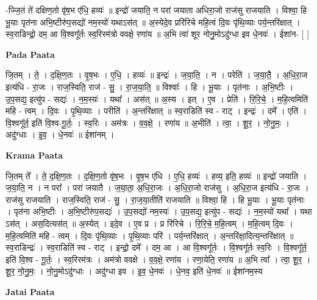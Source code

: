 \documentclass[17pt]{extarticle}
\begin{document}
-ज्जि॒तं ते॑ दक्षिण॒तो वृ॑ष॒भ ए॑धि॒ हव्यः॑ ॥ इन्द्रो॑ जयाति॒ न परा॑ जयाता अधिरा॒जो राज॑सु राजयाति । विश्वा॒ हि भू॒याः पृत॑ना अभि॒ष्टीरु॑प॒सद्यो॑ नम॒स्यो॑ यथाऽस॑त् ॥ अ॒स्येदे॒व प्ररि॑रिचे महि॒त्वं दि॒वः पृ॑थि॒व्याः पर्य॒न्तरि॑क्षात् । स्व॒राडिन्द्रो॒ दम॒ आ वि॒श्वगू᳚र्तः स्व॒रिरम॑त्रो ववक्षे॒ रणा॑य ॥ अ॒भि त्वा॑ शूर नोनु॒मोऽदु॑ग्धा इव धे॒नवः॑ । ईशा॑न- [  ] \newline

\textbf{Pada Paata} \newline

जि॒तम् । ते॒ । द॒क्षि॒ण॒तः । वृ॒ष॒भः । ए॒धि॒ । हव्यः॑ ॥ इन्द्रः॑ । ज॒या॒ति॒ । न । परेति॑ । ज॒या॒तै॒ । अ॒धि॒रा॒ज इत्य॑धि - रा॒जः । राज॒स्विति॒ राज॑ - सु॒ । रा॒ज॒या॒ति॒ ॥ विश्वाः᳚ । हि । भू॒याः । पृत॑नाः । अ॒भि॒ष्टीः । उ॒प॒सद्य॒ इत्यु॑प - सद्यः॑ । न॒म॒स्यः॑ । यथा᳚ । अस॑त् ॥ अ॒स्य । इत् । ए॒व । प्रेति॑ । रि॒रि॒चे॒ । म॒हि॒त्वमिति॑ महि - त्वम् । दि॒वः । पृ॒थि॒व्याः । परीति॑ । अ॒न्तरि॑क्षात् ॥ स्व॒राडिति॑ स्व - राट् । इन्द्रः॑ । दमे᳚ । एति॑ । वि॒श्वगू᳚र्त॒ इति॑ वि॒श्व-गू॒र्तः॒ । स्व॒रिः । अम॑त्रः । व॒व॒क्षे॒ ।    रणा॑य ॥ अ॒भीति॑ । त्वा॒ । शू॒र॒ । नो॒नु॒मः॒ । अदु॑ग्धाः । इ॒व॒ । धे॒नवः॑ ॥ ईशा॑नम् ।  \newline


\textbf{Krama Paata} \newline

जि॒तम् ते᳚ । ते॒ द॒क्षि॒ण॒तः । द॒क्षि॒ण॒तो वृ॑ष॒भः । वृ॒ष॒भ ए॑धि । ए॒धि॒ हव्यः॑ । हव्य॒ इति॒ हव्यः॑ ॥ इन्द्रो॑ जयाति । ज॒या॒ति॒ न । न परा᳚ । परा॑ जयातै । ज॒या॒ता॒ अ॒धि॒रा॒जः । अ॒धि॒रा॒जो राज॑सु । अ॒धि॒रा॒ज इत्य॑धि - रा॒जः । राज॑सु राजयाति । राज॒स्विति॒ राज॑ - सु॒ । रा॒ज॒या॒तीति॑ राजयाति ॥ विश्वा॒ हि । हि भू॒याः । भू॒याः पृत॑नाः । पृत॑ना अभि॒ष्टीः । अ॒भि॒ष्टीरु॑प॒सद्यः॑ । उ॒प॒सद्यो॑ नम॒स्यः॑ । उ॒प॒सद्य॒ इत्यु॑प - सद्यः॑ । न॒म॒स्यो॑ यथा᳚ । यथा ऽस॑त् । अस॒दित्यस॑त् ॥ अ॒स्येत् । इदे॒व । ए॒व प्र । प्र रि॑रिचे । रि॒रि॒चे॒ म॒हि॒त्वम् । म॒हि॒त्वम् दि॒वः । म॒हि॒त्वमिति॑ महि - त्वम् । दि॒वः पृ॑थि॒व्याः । पृ॒थि॒व्याः परि॑ । पर्य॒न्तरि॑क्षात् । अ॒न्तरि॑क्षा॒दित्य॒न्तरि॑क्षात् ॥ स्व॒राडिन्द्रः॑ । स्व॒राडिति॑ स्व - राट् । इन्द्रो॒ दमे᳚ । दम॒ आ । आ वि॒श्वगू᳚र्तः । वि॒श्वगू᳚र्तः स्व॒रिः । वि॒श्वगू᳚र्त॒ इति॑ वि॒श्व - गू॒र्तः॒ । स्व॒रिरम॑त्रः । अम॑त्रो ववक्षे । व॒व॒क्षे॒ रणा॑य । रणा॒येति॒ रणा॑य ॥ अ॒भि त्वा᳚ । त्वा॒ शू॒र॒ । शू॒र॒ नो॒नु॒मः॒ । नो॒नु॒मोऽदु॑ग्धाः । अदु॑ग्धा इव । इ॒व॒ धे॒नवः॑ । धे॒नव॒ इति॑ धे॒नवः॑ ॥ ईशा॑नम॒स्य \newline

\textbf{Jatai Paata} \newline
\end{document}

